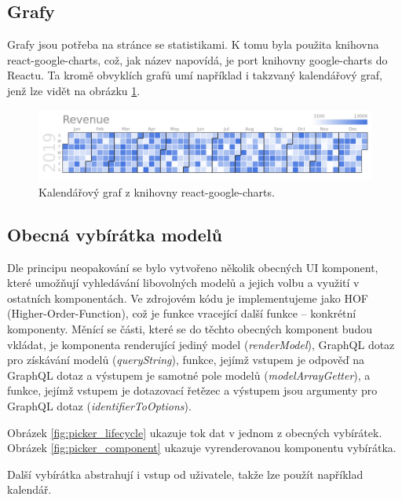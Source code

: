\subsection{Grafy}

\noindent
Grafy jsou potřeba na stránce se statistikami. K tomu byla použita knihovna react-google-charts,
což, jak název napovídá, je port knihovny google-charts do Reactu. Ta kromě obvyklích grafů umí
například i takzvaný kalendářový graf, jenž lze vidět na obrázku \ref{fig:google_charts}.

\begin{figure}[!htb] \centering
  \includegraphics[width=145mm]{../img/google_charts.png}
  \caption{Kalendářový graf z knihovny react-google-charts.}
  \label{fig:google_charts}
\end{figure}

\subsection{Obecná vybírátka modelů}

\noindent
Dle principu neopakování se bylo vytvořeno několik obecných UI komponent, které umožňují vyhledávání libovolných
modelů a jejich volbu a využití v ostatních komponentách. Ve zdrojovém kódu je implementujeme jako
HOF (Higher-Order-Function), což je funkce vracející další funkce -- konkrétní komponenty.
Měnící se části, které se do těchto obecných komponent budou vkládat, je komponenta renderující jediný model
(\textit{renderModel}),
GraphQL dotaz pro získávání modelů (\textit{queryString}), funkce, jejímž vstupem je odpověď na GraphQL dotaz a výstupem je
samotné pole modelů (\textit{modelArrayGetter}), a funkce, jejímž vstupem je dotazovací řetězec a výstupem jsou
argumenty pro GraphQL dotaz (\textit{identifierToOptions}).

Obrázek \ref{fig:picker_lifecycle} ukazuje tok dat v jednom z obecných vybírátek.
Obrázek \ref{fig:picker_component} ukazuje vyrenderovanou komponentu vybírátka.

Další vybírátka abstrahují i vstup od uživatele, takže lze použít například kalendář.

